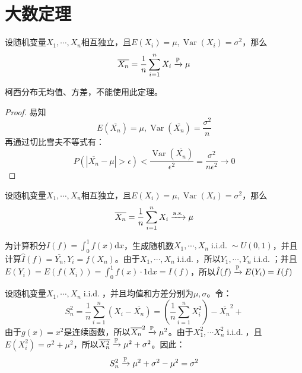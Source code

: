 \section{大数定理}\label{sec:large_number}

\begin{theorem}[弱大数定理]
    设随机变量$X_1,\cdots ,X_n$相互独立，且$E(X_i)=\mu,\operatorname{Var}(X_i)=\sigma^2$，那么
    \[ \overline{X_n}=\frac{1}{n}\sum_{i=1}^n X_i \xrightarrow{\P} \mu \]
\end{theorem}

\begin{remark}
    柯西分布无均值、方差，不能使用此定理。
\end{remark}

\begin{proof}
    易知
    \[ E(\overline{X_n})=\mu,\operatorname{Var}(\overline{X_n})=\frac{\sigma^2}{n} \]
    再通过切比雪夫不等式有：
    \[ P(\left\vert \overline{X_n}-\mu \right\vert >\epsilon)<\frac{\operatorname{Var}(\overline{X_n})}{\epsilon^{2}}=\frac{\sigma^2}{n \epsilon^2} \to 0 \]
\end{proof}

\begin{theorem}[强大数定理]
    设随机变量$X_1,\cdots ,X_n$相互独立，且$E(X_i)=\mu,\operatorname{Var}(X_i)=\sigma^2$，那么
    \[ \overline{X_n}=\frac{1}{n}\sum_{i=1}^n X_i \xrightarrow{\as} \mu \]
\end{theorem}

\begin{example}[蒙特卡洛积分]
    为计算积分$I(f)=\int_0^1 f(x)\mathrm{d}x$，生成随机数$X_1,\cdots ,X_n \operatorname{i.i.d.} \sim U(0,1)$，并且计算$\hat{I}(f)=\overline{Y_n}, Y_i=f(X_n) $。由于$X_1,\cdots ,X_n \operatorname{i.i.d.}$，所以$Y_1,\cdots ,Y_n \operatorname{i.i.d.}$；并且$E(Y_i)=E(f(X_i))=\int_0^1 f(x)\cdot 1\mathrm{d}x=I(f)$，所以$\hat{I}(f)\xrightarrow{\P} E(Y_i)=I(f)$
\end{example}

\begin{example}[样本方差]\label{ex:sample_var}
    设随机变量$X_1,\cdots ,X_n \operatorname{i.i.d.}$，并且均值和方差分别为$\mu,\sigma$。令：
    \[ S_n^2=\frac{1}{n}\sum_{i=1}^n(X_i-\overline{X_n}) = (\frac{1}{n}\sum_{i=1}^nX_i^2)-\overline{X_n}^2 +\]
    由于$g(x)=x^2$是连续函数，所以$\overline{X_n}^2 \xrightarrow{\P} \mu^2$。由于$X_1^2,\cdots X_n^2 \operatorname{i.i.d.}$，且$E(X_i^2)=\sigma^2+\mu^2$，所以$\overline{X_n^2} \xrightarrow{\P} \mu^2+\sigma^2$。因此：
    \[ S_n^2 \xrightarrow{\P}\mu^2+\sigma^2-\mu^2= \sigma^2 \]
\end{example}

